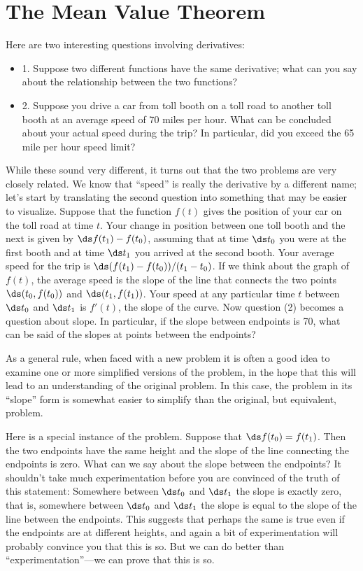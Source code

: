 \section{The Mean Value Theorem}{}{}
\nobreak
Here are two interesting questions involving derivatives:

\begin{itemize} %

\item{1.} Suppose two different functions have the same derivative;
  what can you say about the relationship between the two functions?

\item{2.} Suppose you drive a car from toll booth on a toll road to
  another toll booth at an
  average speed of 70 miles per hour. What can be concluded about your
  actual speed during the trip? In particular, did you exceed the 65
  mile per hour speed limit?

\end{itemize}

While these sound very different, it turns out that the two problems
are very closely related. We know that ``speed'' is really the
derivative by a different name; let's start by translating the second
question into something that may be easier to visualize. Suppose that
the function $f(t)$ gives the position of your car on the toll road at
time $t$. Your change in position between one toll booth and the next
is given by $\ds f(t_1)-f(t_0)$, assuming that at time $\ds t_0$ you were at
the first booth and at time $\ds t_1$ you arrived at the second
booth. Your average speed for the trip is
$\ds (f(t_1)-f(t_0))/(t_1-t_0)$. If we think about the graph of $f(t)$,
the average speed is the slope of the line that connects the two
points $\ds (t_0,f(t_0))$ and $\ds (t_1,f(t_1))$. Your speed at any particular time
$t$ between $\ds t_0$ and $\ds t_1$ is $f'(t)$, the slope of the curve. Now
question (2) becomes a question about slope. In particular, if the
slope between endpoints is 70, what can be said of the slopes at
points between the endpoints?

As a general rule, when faced with a new problem it is often a good idea to
examine one or more simplified versions of the problem, in the hope
that this will lead to an understanding of the original problem.
In this case, the problem in its ``slope'' form is somewhat easier to
simplify than the original, but equivalent, problem.

Here is a special instance of the problem. Suppose that
$\ds f(t_0)=f(t_1)$. Then the two endpoints have the same height and the
slope of the line connecting the endpoints is zero. What can we say
about the slope between the endpoints? It shouldn't take much
experimentation before you are convinced of the truth of this
statement: Somewhere between $\ds t_0$ and $\ds t_1$ the slope is exactly
zero, that is, somewhere between $\ds t_0$ and $\ds t_1$ the slope is equal to
the slope of the line between the endpoints. This suggests that
perhaps the same is true even if the endpoints are at different
heights, and again a bit of experimentation will probably convince you
that this is so. But we can do better than ``experimentation''---we
can prove that this is so.

